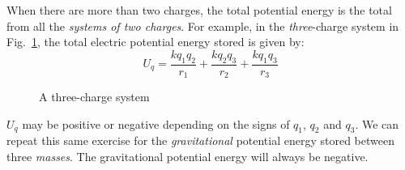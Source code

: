 

When there are more than two charges, the total potential energy is the total
from all the \emph{systems of two charges}. For example, in the
\emph{three}-charge system in Fig.~\ref{fig:3charge}, the total electric
potential energy stored is given by:
\begin{equation*}
  U_q=\frac{kq_1q_2}{r_1} +\frac{kq_2q_3}{r_2} +\frac{kq_1q_3}{r_3}
\end{equation*}

\begin{figure}[ht]
  \centering
  \caption{A three-charge system}
  \label{fig:3charge}
\end{figure}
$U_q$ may be positive or negative depending on the signs of $q_1$, $q_2$ and
$q_3$. We can repeat this same exercise for the \emph{gravitational} potential
energy stored between three \emph{masses}. The gravitational potential energy
will always be negative.

